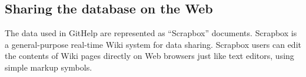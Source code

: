 \documentclass{sigchi}
\def\GH{\textsf{GitHelp}}
\def\SB{\textsf{Scrapbox}}
\begin{document}
% 


% 


\subsection{Sharing the database on the Web}

The data used in {\GH} are represented as ``{\SB}'' documents.
%
{\SB} is a general-purpose real-time Wiki system for data sharing.
{\SB} users can edit the contents of Wiki pages directly
on Web browsers just like text editors,
using simple markup symbols.
\end{document}
